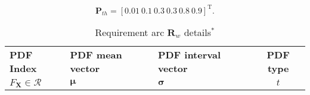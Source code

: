 \begin{equation*}
    \mathbf{P}_{th} = \left[0.01~0.1~0.3~0.3~0.8~0.9\right]^{\mathrm{T}}.
\end{equation*}

\begin{table}[h!]
	\centering
	\renewcommand{\arraystretch}{1.0}%
	\footnotesize\addtolength{\tabcolsep}{-5pt}
	\caption{Requirement arc $\mathbf{R}_w$ details$^*$}
	\label{table:requirementarcex}
	\begin{tabular}{l>{\centering\arraybackslash}p{4.2cm}>{\centering\arraybackslash}p{6cm}c}
	\hline\hline

	\bf \ac{PDF} Index & \bf \ac{PDF} mean vector & \bf \ac{PDF} interval vector & \bf \ac{PDF} type \\
	$F_\mathbf{X} \in \mathcal{R}$ &$\boldsymbol{\mu}$ & $\boldsymbol{\sigma}$ & $t$ \\ \hline


\end{tabular}
\end{table}
